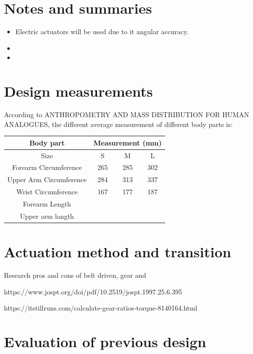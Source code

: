 \section{Notes and summaries}
\begin{itemize}
    \item Electric actuators will be used due to it angular accuracy. 
    \item 
    \item 
\end{itemize}{}


\section{Design measurements}
According to ANTHROPOMETRY AND MASS DISTRIBUTION FOR HUMAN ANALOGUES, the different average measurement of different body parts is: 
\begin{table}[h!]
\centering
\begin{tabular}{|c|c|c|c|}
\hline
\textbf{Body part} & \multicolumn{3}{c|}{\textbf{Measurement (mm)}} \\ \hline
Size & S & M & L \\ \hline
Forearm Circumference & 265 & 285 & 302 \\ \hline
Upper Arm Circumference & 284 & 313 & 337 \\ \hline
Wrist Circumference & 167 & 177 & 187 \\ \hline
Forearm Length &  &  &  \\ \hline
Upper arm langth &  &  &  \\ \hline
\end{tabular}
\end{table}



\section{Actuation method and transition}
Research pros and cons of belt driven, gear and 

https://www.jospt.org/doi/pdf/10.2519/jospt.1997.25.6.395 \newline

https://itstillruns.com/calculate-gear-ratios-torque-8140164.html \newline

\section{Evaluation of previous design}


